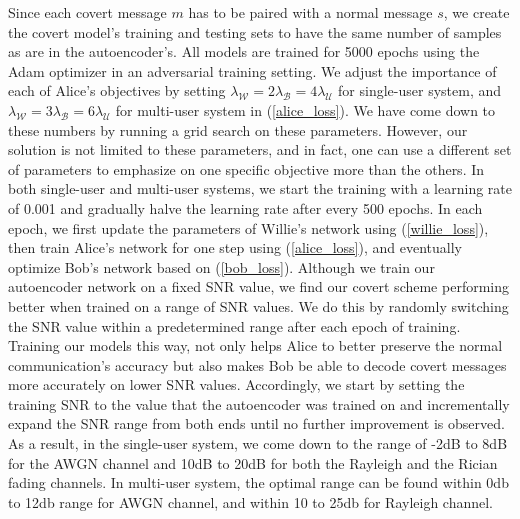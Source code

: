 Since each covert message \(m\) has to be paired with a normal message \(s\), we create the covert model's training and testing sets to have the same number of samples as are in the autoencoder's. All models are trained for 5000 epochs using the Adam optimizer in an adversarial training setting. We adjust the importance of each of Alice's objectives by setting \(\lambda_{\mathcal{W}} = 2 \lambda_{\mathcal{B}} = 4 \lambda_{\mathcal{U}}\) for single-user system, and \(\lambda_{\mathcal{W}} = 3 \lambda_{\mathcal{B}} = 6 \lambda_{\mathcal{U}}\) for multi-user system in (\ref{alice_loss}). We have come down to these numbers by running a grid search on these parameters. However, our solution is not limited to these parameters, and in fact, one can use a different set of parameters to emphasize on one specific objective more than the others. In both single-user and multi-user systems, we start the training with a learning rate of 0.001 and gradually halve the learning rate after every 500 epochs. In each epoch, we first update the parameters of Willie's network using (\ref{willie_loss}), then train Alice's network for one step using (\ref{alice_loss}), and eventually optimize Bob's network based on (\ref{bob_loss}). Although we train our autoencoder network on a fixed SNR value, we find our covert scheme performing better when trained on a range of SNR values. We do this by randomly switching the SNR value within a predetermined range after each epoch of training. Training our models this way, not only helps Alice to better preserve the normal communication's accuracy but also makes Bob be able to decode covert messages more accurately on lower SNR values. Accordingly, we start by setting the training SNR to the value that the autoencoder was trained on and incrementally expand the SNR range from both ends until no further improvement is observed. As a result, in the single-user system, we come down to the range of -2dB to 8dB for the AWGN channel and 10dB to 20dB for both the Rayleigh and the Rician fading channels. In multi-user system, the optimal range can be found within 0db to 12db range for AWGN channel, and within 10 to 25db for Rayleigh channel.

